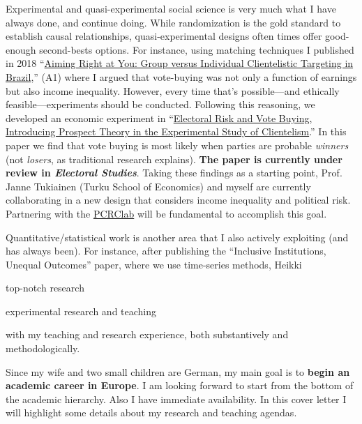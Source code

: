 \documentclass[10pt,stdletter,dateno,sigleft]{newlfm} %
\begin{document}
\begin{newlfm}
Experimental and quasi-experimental social science is very much what I have always done, and continue doing. While randomization is the gold standard to establish causal relationships, quasi-experimental designs often times offer good-enough second-bests options. For instance, using matching techniques I published in 2018 ``\href{https://journals.sub.uni-hamburg.de/giga/jpla/article/view/1121/1128}{Aiming Right at You: Group versus Individual Clientelistic Targeting in Brazil},'' (A1) where I argued that vote-buying was not only a function of earnings but also income inequality. However, every time that's possible---and ethically feasible---experiments should be conducted. Following this reasoning, we developed an economic experiment in ``\href{https://github.com/hbahamonde/Economic_Experiment_Vote_Selling/raw/master/abstract.txt}{Electoral Risk and Vote Buying, Introducing Prospect Theory in the Experimental Study of Clientelism}.'' In this paper we find that vote buying is most likely when parties are probable \emph{winners} (not \emph{losers}, as traditional research explains). {\bf The paper is currently under review in \emph{Electoral Studies}}. Taking these findings as a starting point, Prof. Janne Tukiainen (Turku School of Economics) and myself are currently collaborating in a new design that considers income inequality and political risk. Partnering with the \href{https://pcrclab.utu.fi/?page_id=894&lang=en}{PCRClab} will be fundamental to accomplish this goal. 

Quantitative/statistical work is another area that I also actively exploiting (and has always been). For instance, after publishing the ``Inclusive Institutions, Unequal Outcomes'' paper, where we use time-series methods, Heikki 




top-notch research

experimental research and teaching



with my teaching and research experience, both substantively and methodologically. 

Since my wife and two small children are German, my main goal is to {\bf begin an academic career in Europe}. I am looking forward to start from the bottom of the academic hierarchy. Also I have immediate availability. In this cover letter I will highlight some details about my research and teaching agendas.



{\unskip}


\vspace{-10cm}



\end{newlfm}
\end{document}
